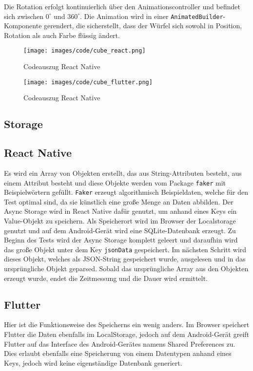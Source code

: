 Die Rotation erfolgt kontinuierlich über den Animationscontroller und befindet sich zwischen \(0^\circ\) und \(360^\circ\). Die Animation wird in einer \texttt{AnimatedBuilder}-Komponente gerendert, die sicherstellt, dass der Würfel sich sowohl in Position, Rotation als auch Farbe flüssig ändert.

\begin{figure}[H]
    \centering
    \begin{minipage}{0.49\textwidth}
        \centering
        \texttt{[image: images/code/cube\_react.png]}
        \caption{Codeauszug React Native}
    \end{minipage} \hfill
    \begin{minipage}{0.49\textwidth}
        \centering
        \texttt{[image: images/code/cube\_flutter.png]}
        \caption{Codeauszug React Native}
    \end{minipage}
\end{figure}

\subsection{Storage}

\subsection*{React Native}
Es wird ein Array von Objekten erstellt, das aus String-Attributen besteht, aus einem Attribut besteht und diese Objekte werden vom Package \texttt{faker} mit Beispielwörtern gefüllt. \texttt{Faker} erzeugt algorithmisch Beispieldaten, welche für den Test optimal sind, da sie künstlich eine große Menge an Daten abbilden. Der Async Storage wird in React Native dafür genutzt, um anhand eines Keys ein Value-Objekt zu speichern. Als Speicherort wird im Browser der Localstorage genutzt und auf dem Android-Gerät wird eine SQLite-Datenbank erzeugt. Zu Beginn des Tests wird der Async Storage komplett geleert und daraufhin wird das große Objekt unter dem Key \texttt{jsonData} gespeichert. Im nächsten Schritt wird dieses Objekt, welches als JSON-String gespeichert wurde, ausgelesen und in das ursprüngliche Objekt geparsed. Sobald das ursprüngliche Array aus den Objekten erzeugt wurde, endet die Zeitmessung und die Dauer wird ermittelt.

\subsection*{Flutter}
Hier ist die Funktionsweise des Speicherns ein wenig anders. Im Browser speichert Flutter die Daten ebenfalls im LocalStorage, jedoch auf dem Android-Gerät greift Flutter auf das Interface des Android-Gerätes namens Shared Preferences zu. Dies erlaubt ebenfalls eine Speicherung von einem Datentypen anhand eines Keys, jedoch wird keine eigenständige Datenbank generiert. 

